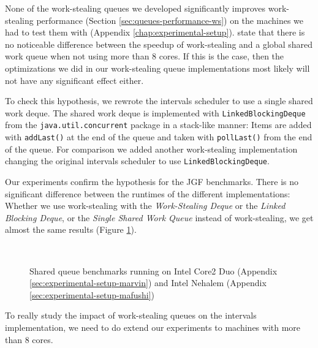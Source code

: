 None of the work-stealing queues we developed significantly improves
work-stealing performance (Section \ref{sec:queues-performance-ws}) on
the machines we had to test them with (Appendix
\ref{chap:experimental-setup}). \textcite{Saha2007} state that there
is no noticeable difference between the speedup of work-stealing and a
global shared work queue when not using more than 8 cores. If this is
the case, then the optimizations we did in our work-stealing queue
implementations most likely will not have any significant effect
either.

To check this hypothesis, we rewrote the intervals scheduler to use a
single shared work deque. The shared work deque is implemented with
\lstinline!LinkedBlockingDeque! from the
\lstinline!java.util.concurrent! package in a stack-like manner: Items
are added with \lstinline!addLast()! at the end of the queue and taken
with \lstinline!pollLast()! from the end of the queue. For comparison
we added another work-stealing implementation changing the original
intervals scheduler to use \lstinline!LinkedBlockingDeque!.

Our experiments confirm the hypothesis for the JGF benchmarks. There
is no significant difference between the runtimes of the different
implementations: Whether we use work-stealing with the
\emph{Work-Stealing Deque} or the \emph{Linked Blocking Deque}, or the
\emph{Single Shared Work Queue} instead of work-stealing, we get
almost the same results (Figure
\ref{fig:queues-performance-shared-queue}).

\begin{figure}[!ht]
  \centering
  \\
  \caption[Single shared work queue benchmark results]{Shared queue
    benchmarks running on Intel Core2 Duo (Appendix
    \ref{sec:experimental-setup-marvin}) and Intel Nehalem (Appendix
    \ref{sec:experimental-setup-mafushi})}
  \label{fig:queues-performance-shared-queue}
\end{figure}

To really study the impact of work-stealing queues on the intervals
implementation, we need to do extend our experiments to machines with
more than 8 cores.


